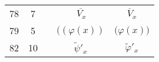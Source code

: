 \documentclass[a4paper,11pt]{article}
\begin{document}
\begin{center}
\begin{tabular}{|c|c|c|c|c|}
    78  &  7 & & $\overline{ \, V_{ x } }$
           & $\overline{ V }_{ x }$ \\
    79  &  5 & & $( ( \varphi( x ) )$ & $\big( \varphi( x ) \big)$ \\
    82  & 10 & & $\widetilde{ \psi }'_{ x }$
           & $\widetilde{ \varphi }'_{ x }$ \\
    \hline
  \end{tabular}


\end{center}
\end{document}
